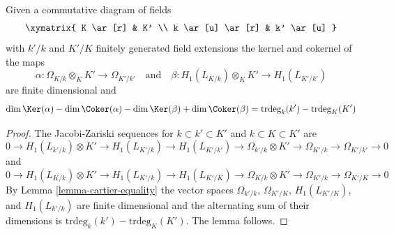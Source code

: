 \begin{lemma}
\label{lemma-gamma-commutative-diagram}
Given a commutative diagram of fields
$$
\xymatrix{
K \ar[r] & K' \\
k \ar[u] \ar[r] & k' \ar[u]
}
$$
with $k'/k$ and $K'/K$ finitely generated field extensions
the kernel and cokernel of the maps
$$
\alpha : \Omega_{K/k} \otimes_K K' \to \Omega_{K'/k'}
\quad\text{and}\quad
\beta : H_1(L_{K/k}) \otimes_K K' \to H_1(L_{K'/k'})
$$
are finite dimensional and
$$
\dim \Ker(\alpha) - \dim \Coker(\alpha)
-\dim \Ker(\beta) + \dim \Coker(\beta)
=
\text{trdeg}_k(k') - \text{trdeg}_K(K')
$$
\end{lemma}

\begin{proof}
The Jacobi-Zariski sequences for $k \subset k' \subset K'$ and
$k \subset K \subset K'$ are
$$
0 \to H_1(L_{k'/k}) \otimes K'  \to
H_1(L_{K'/k}) \to
H_1(L_{K'/k'}) \to
\Omega_{k'/k} \otimes K' \to
\Omega_{K'/k} \to
\Omega_{K'/k'} \to 0
$$
and
$$
0 \to H_1(L_{K/k}) \otimes K' \to
H_1(L_{K'/k}) \to
H_1(L_{K'/K}) \to
\Omega_{K/k} \otimes K' \to
\Omega_{K'/k} \to
\Omega_{K'/K} \to 0
$$
By
Lemma \ref{lemma-cartier-equality}
the vector spaces $\Omega_{k'/k}$, $\Omega_{K'/K}$, $H_1(L_{K'/K})$, and
$H_1(L_{k'/k})$ are finite dimensional and the alternating sum of their
dimensions is $\text{trdeg}_k(k') - \text{trdeg}_K(K')$.
The lemma follows.
\end{proof}
